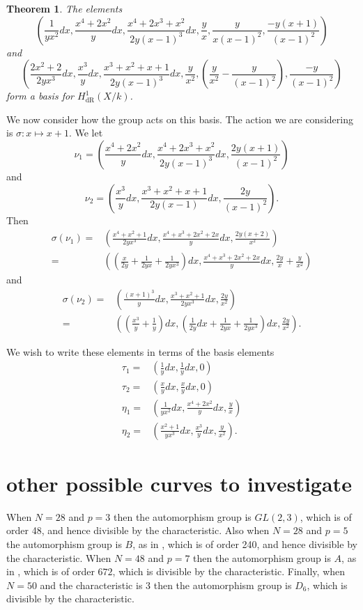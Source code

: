 \documentclass[draft, 11pt]{article} %
\theoremstyle{plain}
\newtheorem{thm}[defn]{Theorem}
\theoremstyle{remark}
\newcommand{\derhamhone}{H_{\text {dR}}^1(X/k)}
\begin{document}
\begin{thm}
The elements
\[
\left( \frac{1}{yx^2}dx, \frac{x^4+2x^2}{y}dx, \frac{x^4 + 2x^3 + x^2}{2y(x-1)^3}dx, \frac{y}{x}, \frac{y}{x(x-1)^2}, \frac{-y(x+1)}{(x-1)^2} \right)
\]
and
\[
\left( \frac{2x^2 + 2}{2yx^3}dx, \frac{x^3}{y}dx, \frac{x^3 + x^2 + x + 1}{2y(x-1)^3}dx, \frac{y}{x^2}, \left( \frac{y}{x^2} - \frac{y}{(x-1)^2}\right), \frac{-y}{(x-1)^2}\right)
\]
form a basis for $\derhamhone$.
\end{thm}

We now consider how the group acts on this basis.
The action we are considering is $\sigma\colon x \mapsto x+1$.
\newpage
We let 
\[
\nu_1 = \left( \frac{x^4 + 2x^2}{y}dx , \frac{x^4 + 2x^3 + x^2}{2y(x-1)^3}dx, \frac{2y(x+1)}{(x-1)^2} \right)
\]
and
\[
\nu_2 = \left( \frac{x^3}{y}dx, \frac{ x^3 + x^2 + x + 1}{2y(x-1)}dx, \frac{2y}{(x-1)^2} \right).
\]
Then
\begin{align*}
\sigma(\nu_1) = & \left( \frac{x^4+x^2+1}{2yx^3}dx, \frac{x^4 + x^3 + 2x^2 + 2x}{y}dx, \frac{2y(x+2)}{x^2} \right)\\
= & \left( \left( \frac{x}{2y} + \frac{1}{2yx} + \frac{1}{2yx^3}\right) dx, \frac{x^4 + x^3 + 2x^2 + 2x}{y}dx, \frac{2y}{x} + \frac{y}{x^2} \right)
\end{align*}
and
\begin{align*}
\sigma(\nu_2) = &  \left( \frac{(x+1)^3}{y}dx, \frac{x^3 + x^2 + 1}{2yx^3}dx, \frac{2y}{x^2} \right)\\
= & \left( \left( \frac{x^3}{y} + \frac{1}{y}\right)dx, \left(\frac{1}{2y}dx + \frac{1}{2yx} + \frac{1}{2yx^3}\right)dx, \frac{2y}{x^2} \right).
\end{align*}

We wish to write these elements in terms of the basis elements 
\begin{align*}
\tau_1 = & \left( \frac{1}{y}dx, \frac{1}{y}dx, 0 \right) \\
\tau_2 = & \left( \frac{x}{y}dx, \frac{x}{y}dx, 0 \right) \\
\eta_1 = & \left( \frac{1}{yx^2}dx, \frac{x^4 + 2x^2}{y}dx, \frac{y}{x} \right) \\
\eta_2 = & \left( \frac{x^2 + 1}{yx^3}dx, \frac{x^3}{y}dx, \frac{y}{x^2} \right).
\end{align*}

\section{other possible curves to investigate}
When $N=28$ and $p=3$ then the automorphism group is $GL(2,3)$, which is of order 48, and hence divisible by the characteristic.
Also when $N=28$ and $p=5$ the automorphism group is $B$, as in \cite{automorphismshyperellipticmodular}, which is of order 240, and hence divisible by the characteristic.
When $N=48$ and $p=7$ then the automorphism group is $A$, as in \cite{automorphismshyperellipticmodular}, which is of order $672$, which is divisible by the characteristic.
Finally, when $N=50$ and the characteristic is 3 then the automorphism group is $D_6$, which is divisible by the characteristic.
\end{document}
